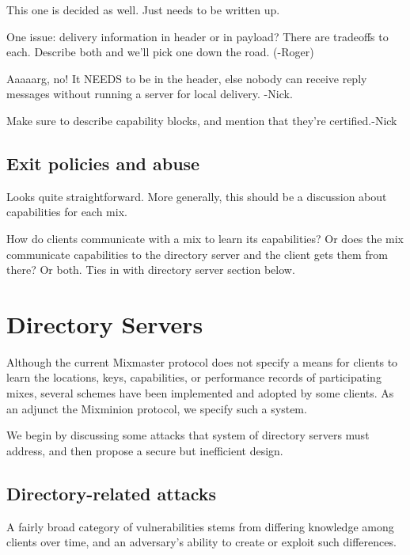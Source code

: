 \documentclass{llncs}
\begin{document}
This one is decided as well. Just needs to be written up.

One issue: delivery information in header or in payload?
There are tradeoffs to each. Describe both and we'll pick one down the
road. (-Roger)

Aaaaarg, no!  It NEEDS to be in the header, else nobody can receive
reply messages without running a server for local delivery. -Nick.

Make sure to describe capability blocks, and mention that they're
certified.-Nick

\subsection{Exit policies and abuse}

Looks quite straightforward. More generally, this should be a discussion
about capabilities for each mix.

How do clients communicate with a mix to learn its capabilities? Or does
the mix communicate capabilities to the directory server and the client
gets them from there? Or both. Ties in with directory server section
below.


\section{Directory Servers}
\label{sec:dir-servers}

Although the current Mixmaster protocol does not specify a means for
clients to learn the locations, keys, capabilities, or performance
records of participating mixes, several schemes have been implemented
\cite{mix-stats} and adopted by some clients.  As an adjunct the
Mixminion protocol, we specify such a system.

We begin by discussing some attacks that system of directory servers
must address, and then propose a secure but inefficient design.

\subsection{Directory-related attacks}
\label{subsec:dir-server-attacks}

A fairly broad category of vulnerabilities stems from differing
knowledge among clients over time, and an adversary's ability to
create or exploit such differences.
\end{document}
